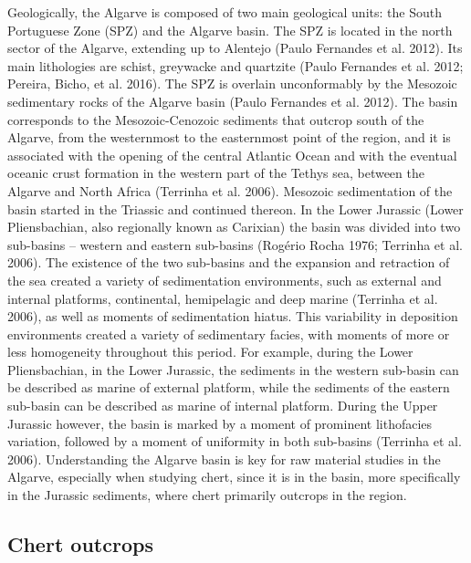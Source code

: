 \documentclass[
  a4paper,
  DIV=11,
  numbers=noendperiod]{scrreprt}
\begin{document}
Geologically, the Algarve is composed of two main geological units: the
South Portuguese Zone (SPZ) and the Algarve basin. The SPZ is located in
the north sector of the Algarve, extending up to Alentejo (Paulo
Fernandes et al. 2012). Its main lithologies are schist, greywacke and
quartzite (Paulo Fernandes et al. 2012; Pereira, Bicho, et al. 2016).
The SPZ is overlain unconformably by the Mesozoic sedimentary rocks of
the Algarve basin (Paulo Fernandes et al. 2012). The basin corresponds
to the Mesozoic-Cenozoic sediments that outcrop south of the Algarve,
from the westernmost to the easternmost point of the region, and it is
associated with the opening of the central Atlantic Ocean and with the
eventual oceanic crust formation in the western part of the Tethys sea,
between the Algarve and North Africa (Terrinha et al. 2006). Mesozoic
sedimentation of the basin started in the Triassic and continued
thereon. In the Lower Jurassic (Lower Pliensbachian, also regionally
known as Carixian) the basin was divided into two sub-basins -- western
and eastern sub-basins (Rogério Rocha 1976; Terrinha et al. 2006). The
existence of the two sub-basins and the expansion and retraction of the
sea created a variety of sedimentation environments, such as external
and internal platforms, continental, hemipelagic and deep marine
(Terrinha et al. 2006), as well as moments of sedimentation hiatus. This
variability in deposition environments created a variety of sedimentary
facies, with moments of more or less homogeneity throughout this period.
For example, during the Lower Pliensbachian, in the Lower Jurassic, the
sediments in the western sub-basin can be described as marine of
external platform, while the sediments of the eastern sub-basin can be
described as marine of internal platform. During the Upper Jurassic
however, the basin is marked by a moment of prominent lithofacies
variation, followed by a moment of uniformity in both sub-basins
(Terrinha et al. 2006). Understanding the Algarve basin is key for raw
material studies in the Algarve, especially when studying chert, since
it is in the basin, more specifically in the Jurassic sediments, where
chert primarily outcrops in the region.

\subsection*{Chert outcrops}\label{chert-outcrops}
\end{document}
